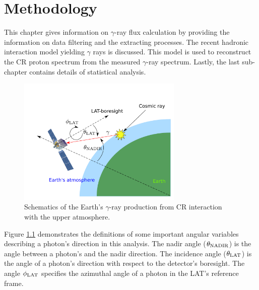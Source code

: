 \chapter{Methodology}

This chapter gives
information on $\gamma$-ray flux calculation 
by providing the information on data filtering and 
the extracting processes.
The recent hadronic interaction model yielding $\gamma$ rays
is discussed. This model is used to reconstruct the CR proton
spectrum from the measured $\gamma$-ray spectrum.
Lastly, the last sub-chapter contains details of statistical analysis.

\begin{figure}[h!]
    \centering
    \includegraphics[width=0.7\textwidth]{content/methodology/figures/gamma_production_schematic}
    \caption{
        Schematics of the Earth's $\gamma$-ray production
        from CR interaction with the upper atmosphere.
    }
    \label{fig:gamma_emis_sp}
\end{figure}

Figure \ref{fig:gamma_emis_sp} demonstrates the definitions of some important angular
variables describing a photon's direction in this analysis.
The nadir angle ($\theta_{\rm NADIR}$) is the angle between a
photon's and the nadir direction. The incidence angle
($\theta_{\rm LAT}$) is the angle of a photon's direction with
respect to the detector's boresight. The angle $\phi_{\rm LAT}$
specifies the azimuthal angle of a photon in the LAT's
reference frame.


